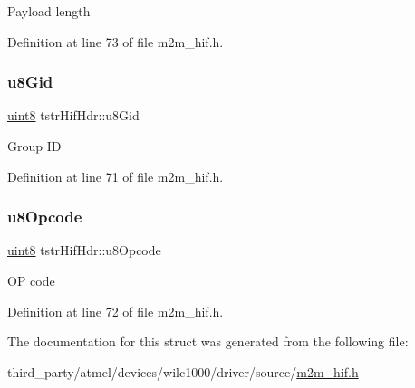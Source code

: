 Payload length 

Definition at line 73 of file m2m\+\_\+hif.\+h.

\mbox{\label{structtstrHifHdr_a7a12aaca5b72583aa35959eba923e466}} 
\subsubsection{\texorpdfstring{u8\+Gid}{u8Gid}}
{\footnotesize\ttfamily \hyperlink{group__DataT_ga4df709a77647e870bbf1d955b8edc9a6}{uint8} tstr\+Hif\+Hdr\+::u8\+Gid}

Group ID 

Definition at line 71 of file m2m\+\_\+hif.\+h.

\mbox{\label{structtstrHifHdr_a95b0cece0166052ed10341584a2bda3f}} 
\subsubsection{\texorpdfstring{u8\+Opcode}{u8Opcode}}
{\footnotesize\ttfamily \hyperlink{group__DataT_ga4df709a77647e870bbf1d955b8edc9a6}{uint8} tstr\+Hif\+Hdr\+::u8\+Opcode}

OP code 

Definition at line 72 of file m2m\+\_\+hif.\+h.



The documentation for this struct was generated from the following file\+:\begin{DoxyCompactItemize}
\item 
third\+\_\+party/atmel/devices/wilc1000/driver/source/\hyperlink{m2m__hif_8h}{m2m\+\_\+hif.\+h}\end{DoxyCompactItemize}
